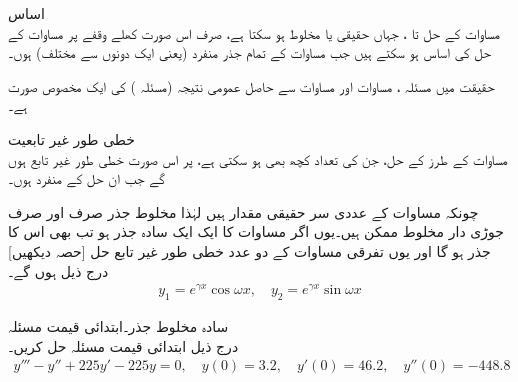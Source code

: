  \quad اساس\\
مساوات  کے حل  تا ، جہاں  حقیقی یا مخلوط ہو سکتا ہے، صرف اس صورت کھلے وقفے پر مساوات  کے حل کی اساس ہو سکتے ہیں جب مساوات  کے تمام  جذر منفرد (یعنی ایک دونوں سے مختلف) ہوں۔

حقیقت میں مسئلہ ، مساوات  اور مساوات  سے حاصل عمومی نتیجہ (مسئلہ ) کی ایک مخصوص صورت ہے۔

 \quad خطی طور غیر تابعیت\\
مساوات  کے  طرز کے حل، جن کی تعداد کچھ بھی ہو سکتی ہے،   پر اس صورت خطی طور غیر تابع ہوں گے جب ان حل کے   منفرد ہوں۔

چونکہ مساوات  کے عددی سر حقیقی مقدار ہیں لہٰذا مخلوط جذر صرف اور صرف جوڑی دار مخلوط ممکن ہیں۔یوں اگر مساوات  کا ایک ایک سادہ جذر  ہو تب  بھی اس کا جذر ہو گا اور یوں تفرقی مساوات کے دو عدد خطی طور غیر تابع حل [حصہ  دیکھیں] درج ذیل ہوں گے۔
\begin{align*}
y_1=e^{\gamma x} \cos \omega x, \quad y_2=e^{\gamma x} \sin \omega x
\end{align*}

\quad سادہ مخلوط جذر۔ابتدائی قیمت مسئلہ\\
درج ذیل ابتدائی قیمت مسئلہ حل کریں۔
\begin{align*}
y'''-y''+225y'-225y=0, \quad y(0)=3.2, \quad y'(0)=46.2, \quad y''(0)=-448.8
\end{align*}

